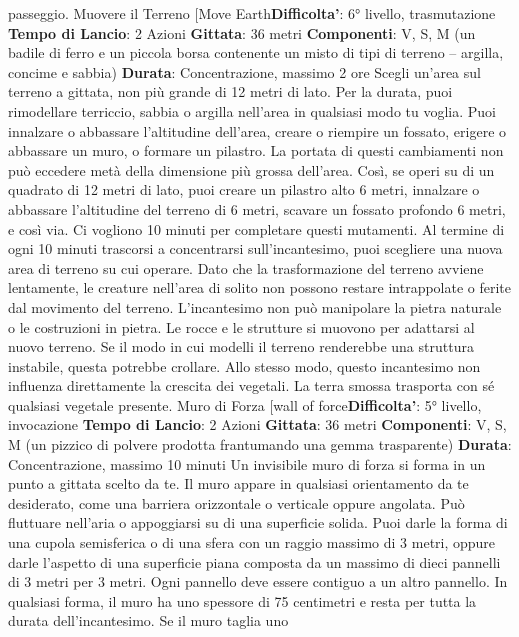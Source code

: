 \begin{multicols}{2}
passeggio.
Muovere il Terreno
[Move Earth\textbf{Difficolta'}:
6° livello, trasmutazione
\textbf{Tempo di Lancio}: 2 Azioni
\textbf{Gittata}: 36 metri
\textbf{Componenti}: V, S, M (un badile di ferro e un piccola
borsa contenente un misto di tipi di terreno – argilla,
concime e sabbia)
\textbf{Durata}: Concentrazione, massimo 2 ore
Scegli un’area sul terreno a gittata, non più grande di
12 metri di lato. Per la durata, puoi rimodellare terriccio,
sabbia o argilla nell’area in qualsiasi modo tu voglia.
Puoi innalzare o abbassare l’altitudine dell’area, creare
o riempire un fossato, erigere o abbassare un muro, o
formare un pilastro. La portata di questi cambiamenti
non può eccedere metà della dimensione più grossa
dell’area. Così, se operi su di un quadrato di 12 metri di
lato, puoi creare un pilastro alto 6 metri, innalzare o
abbassare l’altitudine del terreno di 6 metri, scavare un
fossato profondo 6 metri, e così via. Ci vogliono 10
minuti per completare questi mutamenti.
Al termine di ogni 10 minuti trascorsi a concentrarsi
sull’incantesimo, puoi scegliere una nuova area di
terreno su cui operare.
Dato che la trasformazione del terreno avviene
lentamente, le creature nell’area di solito non possono
restare intrappolate o ferite dal movimento del terreno.
L’incantesimo non può manipolare la pietra naturale o
le costruzioni in pietra. Le rocce e le strutture si
muovono per adattarsi al nuovo terreno. Se il modo in
cui modelli il terreno renderebbe una struttura instabile,
questa potrebbe crollare.
Allo stesso modo, questo incantesimo non influenza
direttamente la crescita dei vegetali. La terra smossa
trasporta con sé qualsiasi vegetale presente.
Muro di Forza
[wall of force\textbf{Difficolta'}:
5° livello, invocazione
\textbf{Tempo di Lancio}: 2 Azioni
\textbf{Gittata}: 36 metri
\textbf{Componenti}: V, S, M (un pizzico di polvere prodotta
frantumando una gemma trasparente)
\textbf{Durata}: Concentrazione, massimo 10 minuti
Un invisibile muro di forza si forma in un punto a gittata
scelto da te. Il muro appare in qualsiasi orientamento
da te desiderato, come una barriera orizzontale o
verticale oppure angolata. Può fluttuare nell’aria o
appoggiarsi su di una superficie solida. Puoi darle la
forma di una cupola semisferica o di una sfera con un
raggio massimo di 3 metri, oppure darle l’aspetto di una
superficie piana composta da un massimo di dieci
pannelli di 3 metri per 3 metri. Ogni pannello deve
essere contiguo a un altro pannello. In qualsiasi forma,
il muro ha uno spessore di 75 centimetri e resta per
tutta la durata dell’incantesimo. Se il muro taglia uno

\end{multicols}
